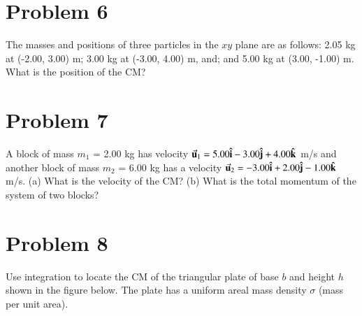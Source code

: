 \documentclass{article}
\begin{document}
\section*{Problem 6}
The masses and positions of three particles in the $xy$ plane are as follows: 2.05 kg at (-2.00, 3.00) m; 3.00 kg
at (-3.00, 4.00) m, and; and 5.00 kg at (3.00, -1.00) m. What is the position of the CM?

\section*{Problem 7}
A block of mass $m_1$ = 2.00 kg has velocity $\va{u}_1 = 5.00 \vu{i} - 3.00 \vu{j} + 4.00 \vu{k}$ m/s and another block of mass
$m_2$ = 6.00 kg has a velocity $\va{u}_2 = -3.00 \vu{i} + 2.00 \vu{j} - 1.00 \vu{k}$ m/s. (a) What is the velocity of the CM? (b)
What is the total momentum of the system of two blocks?

\section*{Problem 8}
Use integration to locate the CM of the triangular plate of base $b$ and height $h$ shown in the figure below.
The plate has a uniform areal mass density $\sigma$ (mass per unit area).
\end{document}
